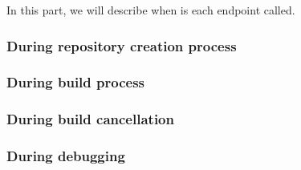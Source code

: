 \documentclass[../main.tex]{subfiles}
\begin{document}
In this part, we will describe when is each endpoint called.

\subsubsection*{During repository creation process}


\subsubsection*{During build process}


\subsubsection*{During build cancellation}


\subsubsection*{During debugging}
\label{subsubsec:during-debugging}

\end{document}
